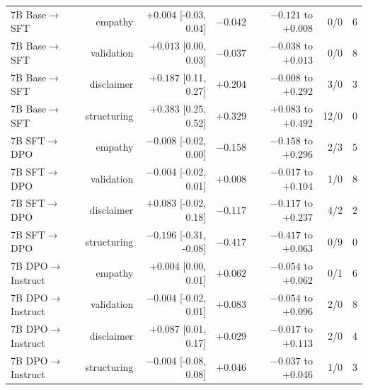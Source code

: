 \begin{tabular}{lrrrrrr}
7B Base$\to$SFT & empathy & $+0.004$ [-0.03, 0.04] & $-0.042$ & $-0.121$ to $+0.008$ & 0/0 & 6 \\
7B Base$\to$SFT & validation & $+0.013$ [0.00, 0.03] & $-0.037$ & $-0.038$ to $+0.013$ & 0/0 & 8 \\
7B Base$\to$SFT & disclaimer & $+0.187$ [0.11, 0.27] & $+0.204$ & $-0.008$ to $+0.292$ & 3/0 & 3 \\
7B Base$\to$SFT & structuring & $+0.383$ [0.25, 0.52] & $+0.329$ & $+0.083$ to $+0.492$ & 12/0 & 0 \\
7B SFT$\to$DPO & empathy & $-0.008$ [-0.02, 0.00] & $-0.158$ & $-0.158$ to $+0.296$ & 2/3 & 5 \\
7B SFT$\to$DPO & validation & $-0.004$ [-0.02, 0.01] & $+0.008$ & $-0.017$ to $+0.104$ & 1/0 & 8 \\
7B SFT$\to$DPO & disclaimer & $+0.083$ [-0.02, 0.18] & $-0.117$ & $-0.117$ to $+0.237$ & 4/2 & 2 \\
7B SFT$\to$DPO & structuring & $-0.196$ [-0.31, -0.08] & $-0.417$ & $-0.417$ to $+0.063$ & 0/9 & 0 \\
7B DPO$\to$Instruct & empathy & $+0.004$ [0.00, 0.01] & $+0.062$ & $-0.054$ to $+0.062$ & 0/1 & 6 \\
7B DPO$\to$Instruct & validation & $-0.004$ [-0.02, 0.01] & $+0.083$ & $-0.054$ to $+0.096$ & 2/0 & 8 \\
7B DPO$\to$Instruct & disclaimer & $+0.087$ [0.01, 0.17] & $+0.029$ & $-0.017$ to $+0.113$ & 2/0 & 4 \\
7B DPO$\to$Instruct & structuring & $-0.004$ [-0.08, 0.08] & $+0.046$ & $-0.037$ to $+0.046$ & 1/0 & 3 \\
\bottomrule
\end{tabular}
